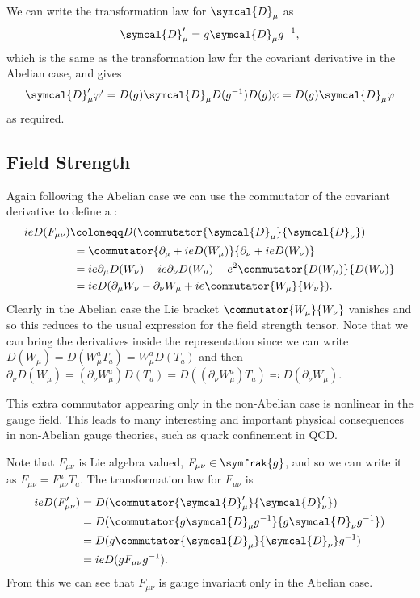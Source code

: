 \documentclass[fleqn]{NotesClass}
\renewcommand{\lie}[1]{\symfrak{#1}}
\newcommand{\covariantDerivative}{\symcal{D}}
\begin{document}
    We can write the transformation law for \(\covariantDerivative_\mu\) as
    \begin{equation}
        \covariantDerivative'_\mu = g \covariantDerivative_\mu g^{-1},
    \end{equation}
    which is the same as the transformation law for the covariant derivative in the Abelian case, and gives
    \begin{equation}
        \covariantDerivative'_\mu \varphi' = D(g)\covariantDerivative_\mu D(g^{-1}) D(g) \varphi = D(g) \covariantDerivative_\mu \varphi
    \end{equation}
    as required.
    
    \subsection{Field Strength}
    Again following the Abelian case we can use the commutator of the covariant derivative to define a :
    \begin{align}
        ieD(F_{\mu\nu}) &\coloneqq D(\commutator{\covariantDerivative_\mu}{\covariantDerivative_\nu})\\
        &\hphantom{:}= \commutator{\partial_\mu + ieD(W_\mu)}{\partial_\nu + ieD(W_\nu)}\\
        &\hphantom{:}= ie\partial_\mu D(W_\nu) - ie\partial_\nu D(W_\mu) - e^2\commutator{D(W_\mu)}{D(W_\nu)}\\
        &\hphantom{:}= ieD(\partial_\mu W_\nu - \partial_\nu W_\mu + ie\commutator{W_\mu}{W_\nu}).
    \end{align}
    Clearly in the Abelian case the Lie bracket \(\commutator{W_\mu}{W_\nu}\) vanishes and so this reduces to the usual expression for the field strength tensor.
    Note that we can bring the derivatives inside the representation since we can write \(D(W_\mu) = D(W_\mu^a T_a) = W_\mu^a D(T_a)\) and then \(\partial_\nu D(W_\mu) = (\partial_\nu W_\mu^a)D(T_a) = D((\partial_\nu W_\mu^a) T_a) \eqqcolon D(\partial_\nu W_\mu)\).
    
    This extra commutator appearing only in the non-Abelian case is nonlinear in the gauge field.
    This leads to many interesting and important physical consequences in non-Abelian gauge theories, such as quark confinement in QCD.
    
    Note that \(F_{\mu\nu}\) is Lie algebra valued, \(F_{\mu\nu} \in \lie{g}\), and so we can write it as \(F_{\mu\nu} = F^a_{\mu\nu}T_a\).
    The transformation law for \(F_{\mu\nu}\) is
    \begin{align}
        ieD(F_{\mu\nu}') &= D(\commutator{\covariantDerivative'_\mu}{\covariantDerivative'_\nu})\\
        &= D(\commutator{g\covariantDerivative_\mu g^{-1}}{g\covariantDerivative_\nu g^{-1}})\\
        &= D(g\commutator{\covariantDerivative_\mu}{\covariantDerivative_\nu}g^{-1})\\
        &= ieD(gF_{\mu\nu}g^{-1}).
    \end{align}
    From this we can see that \(F_{\mu\nu}\) is gauge invariant only in the Abelian case.
    
\end{document}
